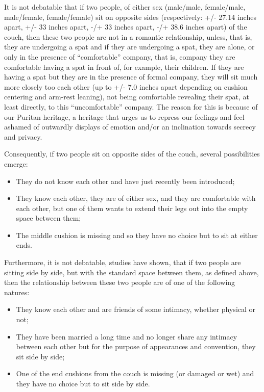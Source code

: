 \documentclass[12pt]{article}
\begin{document}
It is not debatable that if two people, of either sex (male/male,
female/male, male/female, female/female) sit on opposite sides
(respectively: +/- 27.14 inches apart, +/- 33 inches apart, -/+ 33
inches apart, -/+ 38.6 inches apart) of the couch, then these two
people are not in a romantic relationship, unless, that is, they
are undergoing a spat and if they are undergoing a spat, they are
alone, or only in the presence of ``comfortable'' company, that
is, company they are comfortable having a spat in front of, for
example, their children. If they are having a spat but they are in
the presence of formal company, they will sit much more closely
too each other (up to +/- 7.0 inches apart depending on cushion
centering and arm-rest leaning), not being comfortable revealing
their spat, at least directly, to this ``uncomfortable'' company.
The reason for this is because of our Puritan heritage, a heritage
that urges us to repress our feelings and feel ashamed of
outwardly displays of emotion and/or an inclination towards
secrecy and privacy.

Consequently, if two people sit on opposite sides of the couch,
several possibilities emerge: 

\begin{itemize}

\item They do not know each other and have just recently been
introduced;

\item They know each other, they are of either sex, and they are
comfortable with each other, but one of them wants to extend their
legs out into the empty space between them; 

\item The middle cushion is missing and so they have no choice but
to sit at either ends.

\end{itemize}

Furthermore, it is not debatable, studies have shown, that if two
people are sitting side by side, but with the standard space
between them, as defined above, then the relationship between
these two people are of one of the following natures: 

\begin{itemize}

\item They know each other and are friends of some intimacy,
whether physical or not; 

\item They have been married a long time and no longer share any
intimacy between each other but for the purpose of appearances and
convention, they sit side by side; 

\item One of the end cushions from the couch is missing (or
damaged or wet) and they have no choice but to sit side by side.

\end{itemize}
\end{document}
